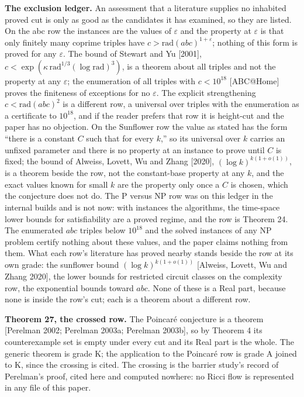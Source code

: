 \documentclass[10pt]{article}
\begin{document}
\textbf{The exclusion ledger.} An assessment that a literature supplies
no inhabited proved cut is only as good as the candidates it has
examined, so they are listed. On the abc row the instances are the
values of \(\varepsilon\) and the property at \(\varepsilon\) is that
only finitely many coprime triples have
\(c > \mathrm{rad}(abc)^{1+\varepsilon}\); nothing of this form is
proved for any \(\varepsilon\). The bound of Stewart and Yu {[}2001{]},
\(c < \exp(\kappa\, \mathrm{rad}^{1/3} (\log \mathrm{rad})^3)\), is a
theorem about all triples and not the property at any \(\varepsilon\);
the enumeration of all triples with \(c < 10^{18}\) {[}ABC@Home{]}
proves the finiteness of exceptions for no \(\varepsilon\). The explicit
strengthening \(c < \mathrm{rad}(abc)^2\) is a different row, a
universal over triples with the enumeration as a certificate to
\(10^{18}\), and if the reader prefers that row it is height-cut and the
paper has no objection. On the Sunflower row the value as stated has the
form ``there is a constant \(C\) such that for every \(k\),'' so its
universal over \(k\) carries an unfixed parameter and there is no
property at an instance to prove until \(C\) is fixed; the bound of
Alweiss, Lovett, Wu and Zhang {[}2020{]}, \((\log k)^{k(1+o(1))}\), is a
theorem beside the row, not the constant-base property at any \(k\), and
the exact values known for small \(k\) are the property only once a
\(C\) is chosen, which the conjecture does not do. The P versus NP row
was on this ledger in the internal builds and is not now: with instances
the algorithms, the time-space lower bounds for satisfiability are a
proved regime, and the row is Theorem 24. The enumerated \(abc\) triples
below \(10^{18}\) and the solved instances of any \(\mathrm{NP}\)
problem certify nothing about these values, and the paper claims nothing
from them. What each row's literature has proved nearby stands beside
the row at its own grade: the sunflower bound \((\log k)^{k(1 + o(1))}\)
{[}Alweiss, Lovett, Wu and Zhang 2020{]}, the lower bounds for
restricted circuit classes on the complexity row, the exponential bounds
toward \(abc\). None of these is a Real part, because none is inside the
row's cut; each is a theorem about a different row.

\textbf{Theorem 27, the crossed row.} The Poincaré conjecture is a
theorem {[}Perelman 2002; Perelman 2003a; Perelman 2003b{]}, so by
Theorem 4 its counterexample set is empty under every cut and its Real
part is the whole. The generic theorem is grade K; the application to
the Poincaré row is grade A joined to K, since the crossing is cited.
The crossing is the barrier study's record of Perelman's proof, cited
here and computed nowhere: no Ricci flow is represented in any file of
this paper.
\end{document}
